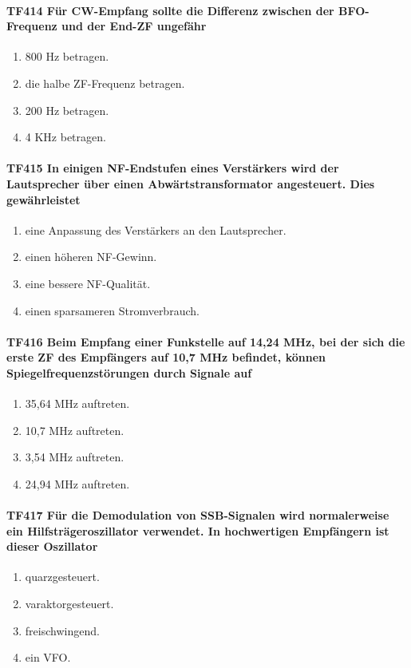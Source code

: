 \documentclass[8pt]{article}
\begin{document}
\paragraph*{TF414 Für CW-Empfang sollte die Differenz zwischen der BFO-Frequenz und der End-ZF ungefähr}
\begin{enumerate}[nolistsep,label=\Alph*]
\item 800 Hz betragen.
\item die halbe ZF-Frequenz betragen.
\item 200 Hz betragen.
\item 4 KHz betragen.
\end{enumerate}

\paragraph*{TF415 In einigen NF-Endstufen eines Verstärkers wird der Lautsprecher über einen Abwärtstransformator angesteuert. Dies gewährleistet} 
\begin{enumerate}[nolistsep,label=\Alph*]
\item eine Anpassung des Verstärkers an den Lautsprecher.
\item einen höheren NF-Gewinn.
\item eine bessere NF-Qualität.
\item einen sparsameren Stromverbrauch.
\end{enumerate}

\paragraph*{TF416 Beim Empfang einer Funkstelle auf 14,24 MHz, bei der sich die erste ZF des Empfängers auf 10,7 MHz befindet, können Spiegelfrequenzstörungen durch Signale auf}
\begin{enumerate}[nolistsep,label=\Alph*]
\item 35,64 MHz auftreten.
\item 10,7 MHz auftreten.
\item 3,54 MHz auftreten.
\item 24,94 MHz auftreten.
\end{enumerate}

\paragraph*{TF417 Für die Demodulation von SSB-Signalen wird normalerweise ein Hilfsträgeroszillator verwendet. In hochwertigen Empfängern ist dieser Oszillator}
\begin{enumerate}[nolistsep,label=\Alph*]
\item quarzgesteuert.
\item varaktorgesteuert.
\item freischwingend.
\item ein VFO.
\end{enumerate}
\end{document}
